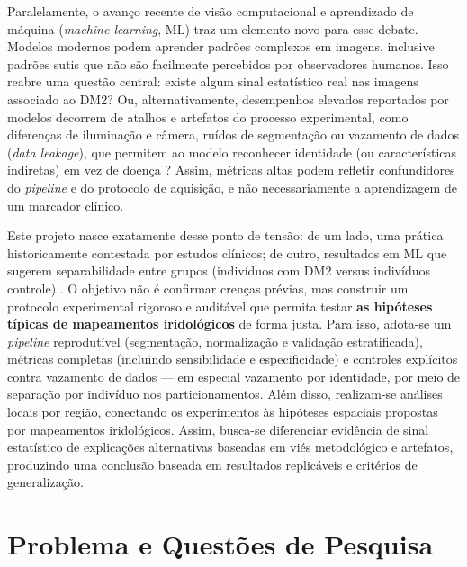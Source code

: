 \documentclass[12pt,a4paper]{article}
\begin{document}
Paralelamente, o avanço recente de visão computacional e aprendizado de máquina (\textit{machine learning}, ML) traz um elemento novo para esse debate. Modelos modernos podem aprender padrões complexos em imagens, inclusive padrões sutis que não são facilmente percebidos por observadores humanos. Isso reabre uma questão central: existe algum sinal estatístico real nas imagens associado ao DM2? Ou, alternativamente, desempenhos elevados reportados por modelos decorrem de atalhos e artefatos do processo experimental, como diferenças de iluminação e câmera, ruídos de segmentação ou vazamento de dados (\textit{data leakage}), que permitem ao modelo reconhecer identidade (ou características indiretas) em vez de doença \citep{SamantAgarwal2018CMPB}? Assim, métricas altas podem refletir confundidores do \textit{pipeline} e do protocolo de aquisição, e não necessariamente a aprendizagem de um marcador clínico.

Este projeto nasce exatamente desse ponto de tensão: de um lado, uma prática historicamente contestada por estudos clínicos; de outro, resultados em ML que sugerem separabilidade entre grupos (indivíduos com DM2 versus indivíduos controle) \citep{SamantAgarwal2018CMPB}. O objetivo não é confirmar crenças prévias, mas construir um protocolo experimental rigoroso e auditável que permita testar \textbf{as hipóteses típicas de mapeamentos iridológicos} de forma justa. Para isso, adota-se um \textit{pipeline} reprodutível (segmentação, normalização e validação estratificada), métricas completas (incluindo sensibilidade e especificidade) e controles explícitos contra vazamento de dados --- em especial vazamento por identidade, por meio de separação por indivíduo nos particionamentos. Além disso, realizam-se análises locais por região, conectando os experimentos às hipóteses espaciais propostas por mapeamentos iridológicos. Assim, busca-se diferenciar evidência de sinal estatístico de explicações alternativas baseadas em viés metodológico e artefatos, produzindo uma conclusão baseada em resultados replicáveis e critérios de generalização.


\section{Problema e Questões de Pesquisa}
\end{document}
